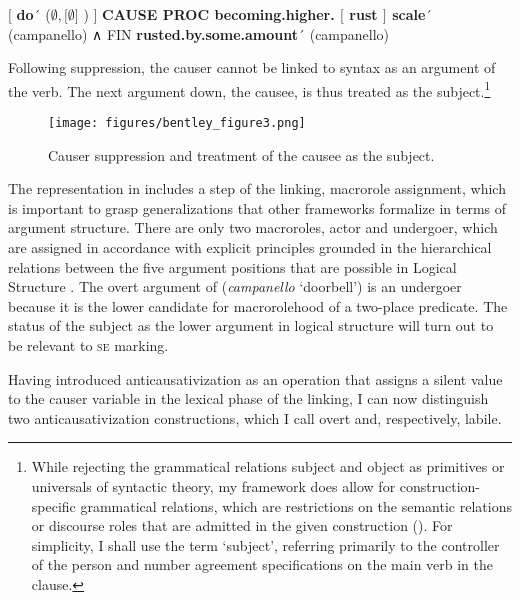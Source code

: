 \documentclass[output=paper,colorlinks,citecolor=brown
]{langscibook}
\begin{document}
\ea  \label{bentley_example_50}
    $\lbrack$ \textbf{do}´ ($\emptyset, \lbrack \emptyset \rbrack$ ) $\rbrack$ \textbf{CAUSE PROC becoming.higher. $\lbrack$ rust $\rbrack$ scale}´ (campanello) ∧ FIN \textbf{rusted.by.some.amount}´ (campanello)
\z

Following suppression, the causer cannot be linked to syntax as an argument of the verb. The next argument down, the causee, is thus treated as the subject.\footnote{While rejecting the grammatical relations subject and object as primitives or universals of syntactic theory, my framework does allow for construction-specific grammatical relations, which are restrictions on the semantic relations or discourse roles that are admitted in the given construction (\cites[242--309]{vanvalin2023principles}{lapolla2023grammatical}). For simplicity, I shall use the term ‘subject’, referring primarily to the controller of the person and number agreement specifications on the main verb in the clause.}

\begin{figure}
\texttt{[image: figures/bentley\_figure3.png]}
\caption{Causer suppression and treatment of the causee as the subject.}
\label{fig:bentley_figure_3}
\end{figure}    


The representation in  includes a step of the linking, macrorole assignment, which is important to grasp generalizations that other frameworks formalize in terms of argument structure. There are only two macroroles, actor and undergoer, which are assigned in accordance with explicit principles grounded in the hierarchical relations between the five argument positions that are possible in Logical Structure \citep[82--198]{vanvalin1997syntax}. The overt argument of  (\textit{campanello} ‘doorbell’) is an undergoer because it is the lower candidate for macrorolehood of a two-place predicate. The status of the subject as the lower argument in logical structure will turn out to be relevant to \textsc{se} marking. 

\begin{sloppypar}
Having introduced anticausativization as an operation that assigns a silent value to the causer variable in the lexical phase of the linking, I can now distinguish two anticausativization constructions, which I call overt and, respectively, labile. 
\end{sloppypar}
\end{document}
